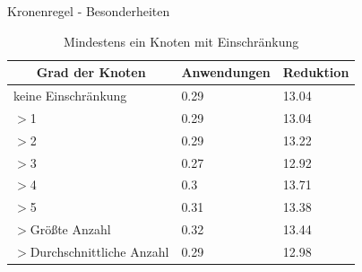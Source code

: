 \documentclass{beamer}
\begin{document}
\begin{frame}{Kronenregel - Besonderheiten}

\begin{table}[htb]
\caption{Mindestens ein Knoten mit Einschränkung\label{tab:degreeOR}}
\vspace*{1em}
\centering

\bgroup
\def\arraystretch{1.3}%


\begin{tabular}[c]{l|l|l}
	
	\multicolumn{1}{c|}{\textbf{Grad der Knoten}} & 
	\multicolumn{1}{c|}{\textbf{Anwendungen}} & 
	\multicolumn{1}{c}{\textbf{Reduktion}} \\ 
	
	\hline

	keine Einschränkung&0.29&13.04\\
	$>$1&0.29 &13.04 \\
	$>$2&0.29 &13.22 \\
	$>$3& 0.27& 12.92 \\
	$>$4& 0.3& 13.71 \\
	$>$5& 0.31&13.38 \\ \pause
	$>$Größte Anzahl& 0.32&13.44 \\
	$>$Durchschnittliche Anzahl& 0.29&12.98 \\
	
\end{tabular}


\egroup

\end{table}

\end{frame}
\end{document}
